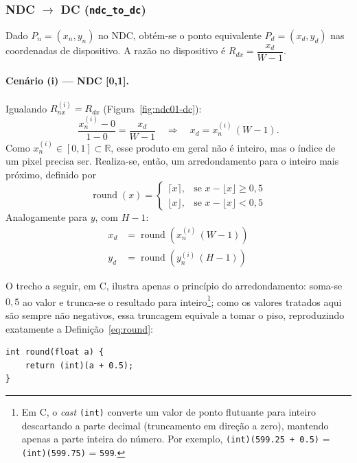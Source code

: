 \subsubsection{\texorpdfstring{NDC $\rightarrow$ DC}{NDC -> DC} (\texttt{ndc\_to\_dc})}
Dado $P_n = (x_n, y_n)$ no NDC, obtém-se o ponto equivalente $P_d = (x_d, y_d)$ nas coordenadas de dispositivo. A razão no dispositivo é $R_{dx} = \dfrac{x_d}{W-1}$.

\paragraph{Cenário (i) --- NDC [0,1].} Igualando $R_{nx}^{(i)} = R_{dx}$ (Figura~\ref{fig:ndc01-dc}):
\[
    \frac{x_n^{(i)} - 0}{1 - 0} = \frac{x_d}{W-1}
    \quad \Rightarrow \quad
    x_d = x_n^{(i)} \, (W-1).
\]
Como $x_n^{(i)} \in [0,1] \subset \mathbb{R}$, esse produto em geral não é inteiro, mas o índice de um pixel precisa ser. Realiza-se, então, um arredondamento para o inteiro mais próximo, definido por
\begin{equation}
    \operatorname{round}(x) =
    \begin{cases}
        \lceil x \rceil, & \text{se } x - \lfloor x \rfloor \ge 0{,}5 \\
        \lfloor x \rfloor, & \text{se } x - \lfloor x \rfloor < 0{,}5
    \end{cases}
    \label{eq:round}
\end{equation}
Analogamente para $y$, com $H-1$:
\begin{equation}
    \boxed{\begin{aligned}
        x_d &= \operatorname{round}\!\left( x_n^{(i)} \, (W-1) \right) \\
        y_d &= \operatorname{round}\!\left( y_n^{(i)} \, (H-1) \right)
    \end{aligned}}
    \label{eq:ndc-dc-i}
\end{equation}

O trecho a seguir, em C, ilustra apenas o princípio do arredondamento: soma-se $0{,}5$ ao valor e trunca-se o resultado para inteiro\footnote{Em C, o \textit{cast} \texttt{(int)} converte um valor de ponto flutuante para inteiro descartando a parte decimal (truncamento em direção a zero), mantendo apenas a parte inteira do número. Por exemplo, \texttt{(int)(599.25 + 0.5)} = \texttt{(int)(599.75)} = \texttt{599}.}; como os valores tratados aqui são sempre não negativos, essa truncagem equivale a tomar o piso, reproduzindo exatamente a Definição~\eqref{eq:round}:
\begin{verbatim}
int round(float a) {
    return (int)(a + 0.5);
}
\end{verbatim}

